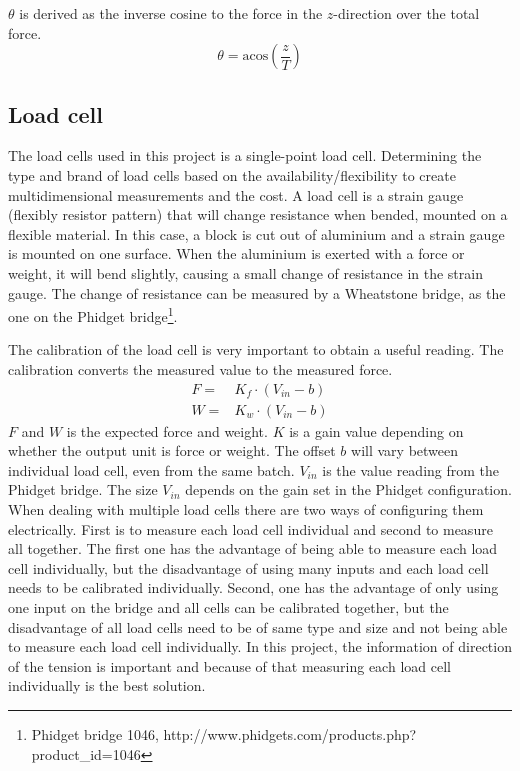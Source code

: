 \noindent
$\theta$ is derived as the inverse cosine to the force in the $z$-direction over the total force.
\begin{equation}
\theta = \mathrm{acos}\left( \frac{z}{T} \right)
\end{equation}

\subsection{Load cell}
The load cells used in this project is a single-point load cell. Determining the type and brand of load cells based on the availability/flexibility to create multidimensional measurements and the cost. A load cell is a strain gauge (flexibly resistor pattern) that will change resistance when bended, mounted on a flexible material. In this case, a block is cut out of aluminium and a strain gauge is mounted on one surface. When the aluminium is exerted with a force or weight, it will bend slightly, causing a small change of resistance in the strain gauge. The change of resistance can be measured by a Wheatstone bridge, as the one on the Phidget bridge\footnote{Phidget bridge 1046, http://www.phidgets.com/products.php?product\_id=1046}.

\noindent
The calibration of the load cell is very important to obtain a useful reading. The calibration converts the measured value to the measured force.  
\begin{eqnarray}
F =& K_f \cdot (V_{in} - b)\\
W =& K_w \cdot (V_{in} - b)
\end{eqnarray}
$F$ and $W$ is the expected force and weight. $K$ is a gain value depending on whether the output unit is force or weight. The offset $b$ will vary between individual load cell, even from the same batch. $V_{in}$ is the value reading from the Phidget bridge. The size $V_{in}$ depends on the gain set in the Phidget configuration.\\
\noindent
When dealing with multiple load cells there are two ways of configuring them electrically. First is to measure each load cell individual and second to measure all together. The first one has the advantage of being able to measure each load cell individually, but the disadvantage of using many inputs and each load cell needs to be calibrated individually. Second, one has the advantage of only using one input on the bridge and all cells can be calibrated together, but the disadvantage of all load cells need to be of same type and size and not being able to measure each load cell individually. In this project, the information of direction of the tension is important and because of that measuring each load cell individually is the best solution\cite{PhidgetsInc.2012}.

